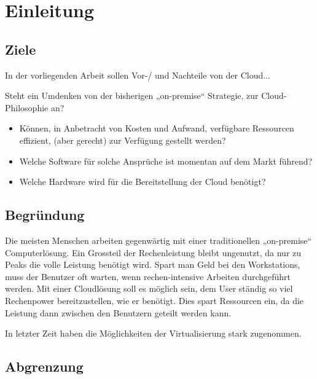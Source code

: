 
\chapter{Einleitung}

\section{Ziele}

In der vorliegenden Arbeit sollen Vor-/ und Nachteile von der Cloud...

Steht ein Umdenken von der bisherigen „on-premise“ Strategie, zur Cloud-Philosophie an?
\begin{itemize}
	\item Können, in Anbetracht von Kosten und Aufwand, verfügbare Ressourcen effizient, (aber gerecht) zur Verfügung gestellt werden?
	\item Welche Software für solche Ansprüche ist momentan auf dem Markt führend?
	\item Welche Hardware wird für die Bereitstellung der Cloud benötigt?
\end{itemize}


\section{Begründung}
Die meisten Menschen arbeiten gegenwärtig mit einer traditionellen „on-premise“ Computerlösung.
Ein Grossteil der Rechenleistung bleibt ungenutzt, da nur zu Peaks die volle Leistung benötigt wird.
Spart man Geld bei den Workstations, muss der Benutzer oft warten, wenn rechen-intensive Arbeiten durchgeführt werden. 
Mit einer Cloudlösung soll es möglich sein, dem User ständig so viel Rechenpower bereitzustellen, wie er benötigt.
Dies spart Ressourcen ein, da die Leistung dann zwischen den Benutzern geteilt werden kann.

In letzter Zeit haben die Möglichkeiten der Virtualisierung stark zugenommen.


\section{Abgrenzung}


